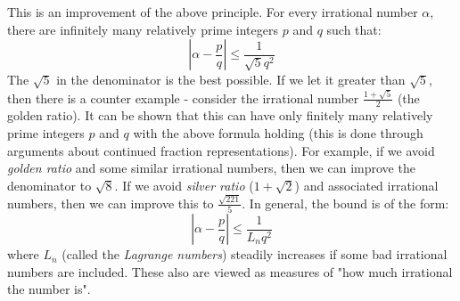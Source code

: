 \begin{curiosity}
This is an improvement of the above principle. For every irrational number $\alpha$, there are infinitely many relatively prime integers $p$ and $q$ such that:
$$\left| \alpha - \frac{p}{q} \right| \le \frac{1}{\sqrt{5}q^2}$$
The $\sqrt{5}$ in the denominator is the best possible. If we let it greater than $\sqrt{5}$, then there is a counter example - consider the irrational number $\frac{1+\sqrt{5}}{2}$ (the golden ratio). It can be shown that this can have only finitely many relatively prime integers $p$ and $q$ with the above formula holding (this is done through arguments about continued fraction representations). For example, if we avoid \textit{golden ratio} and some similar irrational numbers, then we can improve the denominator to $\sqrt{8}$. If we avoid \textit{silver ratio} ($1+\sqrt{2}$) and associated irrational numbers, then we can improve this to $\frac{\sqrt{221}}{5}$. In general, the bound is of the form:
$$\left| \alpha - \frac{p}{q} \right| \le \frac{1}{L_nq^2}$$
where $L_n$ (called the \textit{Lagrange numbers}) steadily increases if some bad irrational numbers are included. These also are viewed as measures of "how much irrational the number is". 
\end{curiosity}


